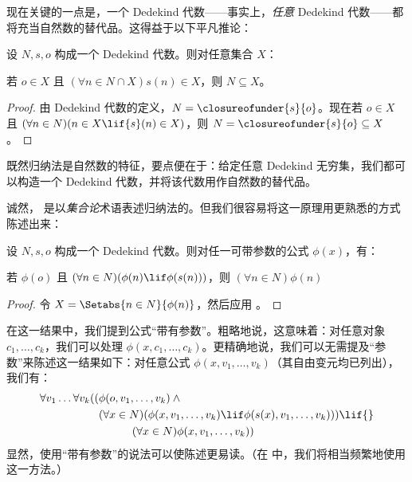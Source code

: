 \documentclass[../../../include/open-logic-section]{subfiles}
\begin{document}

现在关键的一点是，一个 Dedekind 代数——事实上，\emph{任意} Dedekind 代数——都将充当自然数的替代品。这得益于以下平凡推论：

\begin{thm}[算术归纳法]
设 $N, s, o$ 构成一个 Dedekind 代数。则对任意集合 $X$：
	\begin{center}
		若 $o \in X$ 且 $(\forall {n} \in N \cap X){s}({n}) \in X$，{则} $N \subseteq X$。
	\end{center}
\end{thm}

\begin{proof}
由 Dedekind 代数的定义，$N = \closureofunder{s}{o}$。现在若 ${o} \in X$ 且 $(\forall {n} \in N)(n \in X \lif
{s}({n}) \in X)$，则 $N = \closureofunder{s}{o} \subseteq X$。
\end{proof}

既然归纳法是自然数的特征，要点便在于：给定任意 Dedekind 无穷集，我们都可以构造一个 Dedekind 代数，并将该代数用作自然数的替代品。

诚然， 是以\emph{集合论}术语表述归纳法的。但我们很容易将这一原理用更熟悉的方式陈述出来：

\begin{cor}
设 $N, s, o$ 构成一个 Dedekind 代数。则对任一可带参数的公式 $\phi(x)$，有：
\begin{center}
	若 $\phi(o)$ 且 $(\forall {n} \in N)(\phi(n)\lif
	\phi({s}({n})))$，{则} $(\forall n \in N)\phi(n)$
\end{center}
\end{cor}

\begin{proof}
令 $X = \Setabs{n \in N}{\phi(n)}$，然后应用 。
\end{proof}

在这一结果中，我们提到公式“带有参数”。粗略地说，这意味着：对任意对象 $c_1, \ldots, c_k$，我们可以处理 $\phi(x, c_1, \ldots, c_k)$。更精确地说，我们可以无需提及“参数”来陈述这一结果如下：对任意公式 $\phi(x, v_1, \ldots, v_k)$（其自由变元均已列出），我们有：
	\begin{align*}
			\forall v_1 \ldots \forall v_k((&\phi(o, v_1,\ldots, v_k) \land {}\\
			&	(\forall x \in N)(\phi(x,v_1, \ldots, v_k) \lif \phi(s(x), v_1,\ldots, v_k))) \lif {}\\
			&\hspace{3em} (\forall x \in N)\phi(x, v_1,\ldots, v_k))
	\end{align*}
显然，使用“带有参数”的说法可以使陈述更易读。（在  中，我们将相当频繁地使用这一方法。）
\end{document}
